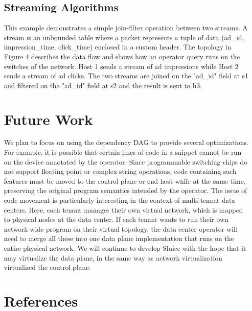   
\subsection{Streaming Algorithms}
This example demonstrates a simple join-filter operation between two streams. A stream is an unbounded table where a packet represents a tuple of data (ad\_id, impression\_time, click\_time) enclosed in a custom header. The topology in Figure 4 describes the data flow and shows how an operator query runs on the switches of the network. Host 1 sends a stream of ad impressions while Host 2 sends a stream of ad clicks. The two streams are joined on the "ad\_id" field at s1 and filtered on the "ad\_id" field at s2 and the result is sent to h3. 


\section{Future Work}
We plan to focus on using the dependency DAG to provide several optimizations. For example, it is possible that certain lines of code in a snippet cannot be run on the device annotated by the operator. Since programmable switching chips do not support floating point or complex string operations, code containing such features must be moved to the control plane or end host while at the same time, preserving the original program semantics intended by the operator. The issue of code movement is particularly interesting in the context of multi-tenant data centers. Here, each tenant manages their own virtual network, which is mapped to physical nodes at the data center. If each tenant wants to run their own network-wide program on their virtual topology, the data center operator will need to merge all these into one data plane implementation that runs on the entire physical network. We will continue to develop Sluice with the hope that it may virtualize the data plane, in the same way as network virtualization virtualized the control plane.

\section{References}
